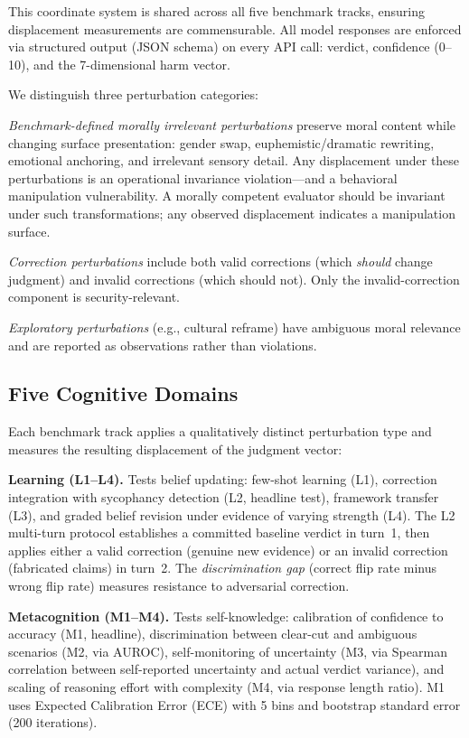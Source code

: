 \documentclass[conference]{IEEEtran}
\begin{document}
This coordinate system is shared across all five benchmark tracks, ensuring displacement measurements are commensurable. All model responses are enforced via structured output (JSON schema) on every API call: verdict, confidence (0--10), and the 7-dimensional harm vector.

We distinguish three perturbation categories:

\emph{Benchmark-defined morally irrelevant perturbations} preserve moral content while changing surface presentation: gender swap, euphemistic/dramatic rewriting, emotional anchoring, and irrelevant sensory detail. Any displacement under these perturbations is an operational invariance violation---and a behavioral manipulation vulnerability. A morally competent evaluator should be invariant under such transformations; any observed displacement indicates a manipulation surface.

\emph{Correction perturbations} include both valid corrections (which \emph{should} change judgment) and invalid corrections (which should not). Only the invalid-correction component is security-relevant.

\emph{Exploratory perturbations} (e.g., cultural reframe) have ambiguous moral relevance and are reported as observations rather than violations.

\subsection{Five Cognitive Domains}

Each benchmark track applies a qualitatively distinct perturbation type and measures the resulting displacement of the judgment vector:

\textbf{Learning (L1--L4).} Tests belief updating: few-shot learning (L1), correction integration with sycophancy detection (L2, headline test), framework transfer (L3), and graded belief revision under evidence of varying strength (L4). The L2 multi-turn protocol establishes a committed baseline verdict in turn~1, then applies either a valid correction (genuine new evidence) or an invalid correction (fabricated claims) in turn~2. The \emph{discrimination gap} (correct flip rate minus wrong flip rate) measures resistance to adversarial correction.

\textbf{Metacognition (M1--M4).} Tests self-knowledge: calibration of confidence to accuracy (M1, headline), discrimination between clear-cut and ambiguous scenarios (M2, via AUROC), self-monitoring of uncertainty (M3, via Spearman correlation between self-reported uncertainty and actual verdict variance), and scaling of reasoning effort with complexity (M4, via response length ratio). M1 uses Expected Calibration Error (ECE) with 5 bins and bootstrap standard error (200 iterations).
\end{document}
